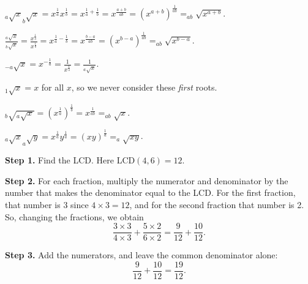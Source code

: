 \begin{enumerate*}
\item $_a\sqrt{x}_b\sqrt{x}=x^{\frac{1}{a}}x^{\frac{1}{b}}=x^{\frac{1}{a}+\frac{1}{b}}=x^{\frac{a+b}{ab}}=({x^{a+b}})^{\frac{1}{ab}}=_{ab}\sqrt{x^{a+b}}.$\\[4pt]
\item $\frac{_a\sqrt{x}}{_b\sqrt{x}}=\frac{x^{\frac{1}{a}}}{x^{\frac{1}{b}}}=x^{\frac{1}{a}-\frac{1}{b}}=x^{\frac{b-a}{ab}}=({x^{b-a}})^{\frac{1}{ab}}=_{ab}\sqrt{x^{b-a}}.$\\[4pt]
\item $_{-a}\sqrt{x}=x^{-\frac{1}{a}}=\frac{1}{x^{\frac{1}{a}}}=\frac{1}{_a\sqrt{x}}.$\\[4pt]
\item $_1\sqrt{x}=x$ for all $x$, so we never consider these \textit{first} roots.\\[4pt]
\item $_b\sqrt{_a\sqrt{x}}=(x^\frac{1}{a})^\frac{1}{b}=x^{\frac{1}{ab}}=_{ab}\sqrt{x}$.\\[4pt]
\item $_a\sqrt{x}_a\sqrt{y}=x^{\frac{1}{a}}y^{\frac{1}{a}}=(xy)^{\frac{1}{a}}=_a\sqrt{xy}$.
\end{enumerate*}

\begin{itemize*}
\item \textbf{Step 1.} Find the LCD.  Here LCD$(4,6)=12$.
\item \textbf{Step 2.} For each fraction, multiply the numerator and denominator by the number that makes the denominator equal to the LCD.  For the first fraction, that number is 3 since $4\times3=12$, and for the second fraction that number is 2.  So, changing the fractions, we obtain
\begin{equation*}
\frac{3\times3}{4\times3}+\frac{5\times2}{6\times2}=\frac{9}{12}+\frac{10}{12}.
\end{equation*}
\item \textbf{Step 3.} Add the numerators, and leave the common denominator alone:
\begin{equation*}
\frac{9}{12}+\frac{10}{12}=\frac{19}{12}.
\end{equation*}
\end{itemize*}

